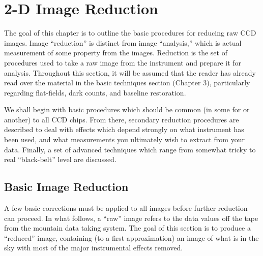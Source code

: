 %
%
%
%
%
%


%
%
%
%
%

\chapter{2-D Image Reduction}

The goal of this chapter is to outline the basic procedures for reducing raw
CCD images.  Image ``reduction'' is distinct from image ``analysis,'' which is
actual measurement of some property from the images.  Reduction is the set of
procedures used to take a raw image from the instrument and prepare it for
analysis.   Throughout this section, it will be assumed that the reader has
already read over the material in the basic techniques section (Chapter 3),
particularly regarding flat-fields, dark counts, and baseline restoration. 

We shall begin with basic procedures which should be common (in some for or
another) to all CCD chips.  From there, secondary reduction procedures are
described to deal with effects which depend strongly on what instrument has
been used, and what measurements you ultimately wish to extract from your
data.  Finally, a set of advanced techniques which range from somewhat tricky
to real ``black-belt'' level are discussed. 


\section{Basic Image Reduction}

A few basic corrections must be applied to all images before further reduction
can proceed.  In what follows, a ``raw'' image refers to the data values off
the tape from the mountain data taking system.  The goal of this section is to
produce a ``reduced'' image, containing (to a first approximation) an image of
what is in the sky with most of the major instrumental effects removed. 

